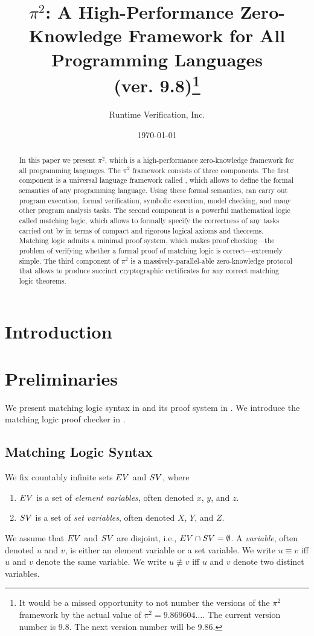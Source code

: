 \documentclass{article}
\title{$\pi^2$: A High-Performance Zero-Knowledge Framework for All Programming Languages\\\Large(ver. 9.8)\footnote{It would be a missed opportunity to not number the versions of the $\pi^2$ framework by
the actual value of $\pi^2 = 9.869604\ldots$. 
The current version number is 9.8.
The next version number will be 9.86.}}
\author{Runtime Verification, Inc.}
\date{\today}
\begin{document}
\maketitle

\begin{abstract}
In this paper we present $\pi^2$, which is a high-performance zero-knowledge
framework for all programming languages. 
The $\pi^2$ framework consists of three components. 
The first component is a universal language framework called \K,
which allows to define the formal semantics of any programming language.
Using these formal semantics, 
\K can carry out program execution, formal verification, symbolic execution,
model checking, and many other program analysis tasks. 
The second component is a powerful mathematical logic called
matching logic, which allows to formally specify the correctness of 
any tasks carried out by \K in terms of compact and rigorous logical axioms and theorems. 
Matching logic admits a minimal proof system, which makes proof checking---the problem of verifying whether a formal proof of matching logic is correct---extremely simple. 
The third component of $\pi^2$ is a massively-parallel-able zero-knowledge 
protocol that allows to produce succinct cryptographic certificates
for any correct matching logic theorems. 
\end{abstract}

\section{Introduction}

\section{Preliminaries}

We present matching logic syntax in 
and its proof system in . 
We introduce the matching logic proof checker in . 

\subsection{Matching Logic Syntax}
\label{sec:ml_syntax}

We fix countably infinite sets $EV$ and $SV$, where
\begin{enumerate}
\item $EV$ is a set of \emph{element variables},
      often denoted $x$, $y$, and $z$. 
\item $SV$ is a set of \emph{set variables},
      often denoted $X$, $Y$, and $Z$.
\end{enumerate}
We assume that $EV$ and $SV$ are disjoint, i.e., $EV \cap SV = \emptyset$. 
A \emph{variable}, often denoted $u$ and $v$,
is either an element variable or a set variable.
We write $u \equiv v$ iff $u$ and $v$ denote the same variable.
We write $u \not\equiv v$ iff $u$ and $v$ denote two distinct variables. 
\end{document}
